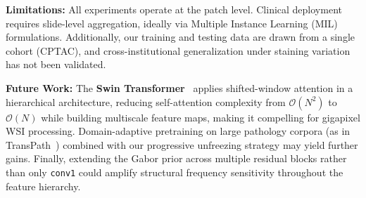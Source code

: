 \documentclass[conference]{IEEEtran}
\begin{document}
\textbf{Limitations:} All experiments operate at the patch level. Clinical deployment requires slide-level aggregation, ideally via Multiple Instance Learning (MIL) formulations. Additionally, our training and testing data are drawn from a single cohort (CPTAC), and cross-institutional generalization under staining variation has not been validated.

\textbf{Future Work:} The \textbf{Swin Transformer}~\cite{b2} applies shifted-window attention in a hierarchical architecture, reducing self-attention complexity from $\mathcal{O}(N^2)$ to $\mathcal{O}(N)$ while building multiscale feature maps, making it compelling for gigapixel WSI processing. Domain-adaptive pretraining on large pathology corpora (as in TransPath~\cite{b2}) combined with our progressive unfreezing strategy may yield further gains. Finally, extending the Gabor prior across multiple residual blocks rather than only \texttt{conv1} could amplify structural frequency sensitivity throughout the feature hierarchy.
\end{document}
